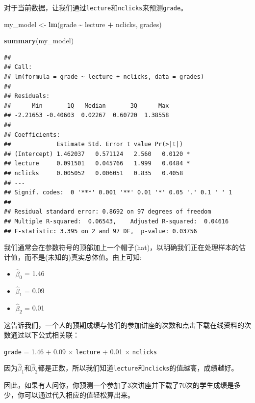 \documentclass[
]{book}
\newenvironment{Shaded}{\begin{snugshade}}{\end{snugshade}}
\newcommand{\FunctionTok}[1]{\textcolor[rgb]{0.13,0.29,0.53}{\textbf{#1}}}
\newcommand{\NormalTok}[1]{#1}
\newcommand{\OtherTok}[1]{\textcolor[rgb]{0.56,0.35,0.01}{#1}}
\newcommand{\SpecialCharTok}[1]{\textcolor[rgb]{0.81,0.36,0.00}{\textbf{#1}}}
\providecommand{\tightlist}{%
  \setlength{\itemsep}{0pt}\setlength{\parskip}{0pt}}
\begin{document}
对于当前数据，让我们通过\texttt{lecture}和\texttt{nclicks}来预测\texttt{grade}。

\begin{Shaded}
\begin{Highlighting}[]
\NormalTok{my\_model }\OtherTok{\textless{}{-}} \FunctionTok{lm}\NormalTok{(grade }\SpecialCharTok{\textasciitilde{}}\NormalTok{ lecture }\SpecialCharTok{+}\NormalTok{ nclicks, grades)}

\FunctionTok{summary}\NormalTok{(my\_model)}
\end{Highlighting}
\end{Shaded}

\begin{verbatim}
## 
## Call:
## lm(formula = grade ~ lecture + nclicks, data = grades)
## 
## Residuals:
##      Min       1Q   Median       3Q      Max 
## -2.21653 -0.40603  0.02267  0.60720  1.38558 
## 
## Coefficients:
##             Estimate Std. Error t value Pr(>|t|)  
## (Intercept) 1.462037   0.571124   2.560   0.0120 *
## lecture     0.091501   0.045766   1.999   0.0484 *
## nclicks     0.005052   0.006051   0.835   0.4058  
## ---
## Signif. codes:  0 '***' 0.001 '**' 0.01 '*' 0.05 '.' 0.1 ' ' 1
## 
## Residual standard error: 0.8692 on 97 degrees of freedom
## Multiple R-squared:  0.06543,    Adjusted R-squared:  0.04616 
## F-statistic: 3.395 on 2 and 97 DF,  p-value: 0.03756
\end{verbatim}

我们通常会在参数符号的顶部加上一个帽子(hat)，以明确我们正在处理样本的估计值，而不是(未知的)真实总体值。由上可知:

\begin{itemize}
\tightlist
\item
  \(\hat{\beta}_0\) = 1.46
\item
  \(\hat{\beta}_1\) = 0.09
\item
  \(\hat{\beta}_2\) = 0.01
\end{itemize}

这告诉我们，一个人的预期成绩与他们的参加讲座的次数和点击下载在线资料的次数通过以下公式相关联：

\texttt{grade} = 1.46 + 0.09 \(\times\) \texttt{lecture} + 0.01 \(\times\) \texttt{nclicks}

因为\(\hat{\beta}_1\)和\(\hat{\beta}_2\)都是正数，所以我们知道\texttt{lecture}和\texttt{nclicks}的值越高，成绩越好。

因此，如果有人问你，你预测一个参加了3次讲座并下载了70次的学生成绩是多少，你可以通过代入相应的值轻松算出来。
\end{document}
